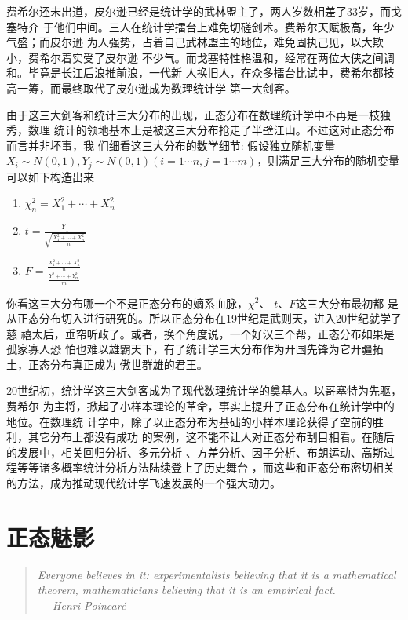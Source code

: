 费希尔还未出道，皮尔逊已经是统计学的武林盟主了，两人岁数相差了33岁，而戈塞特介
于他们中间。三人在统计学擂台上难免切磋剑术。费希尔天赋极高，年少气盛；而皮尔逊
为人强势，占着自己武林盟主的地位，难免固执己见，以大欺小，费希尔着实受了皮尔逊
不少气。而戈塞特性格温和，经常在两位大侠之间调和。毕竟是长江后浪推前浪，一代新
人换旧人，在众多擂台比试中，费希尔都技高一筹，而最终取代了皮尔逊成为数理统计学
第一大剑客。

由于这三大剑客和统计三大分布的出现，正态分布在数理统计学中不再是一枝独秀，数理
统计的领地基本上是被这三大分布抢走了半壁江山。不过这对正态分布而言并非坏事，我
们细看这三大分布的数学细节: 假设独立随机变量 $X_i \sim N(0,1), Y_j \sim N(0,1)
(i=1\cdots n, j=1\cdots m)$，则满足三大分布的随机变量可以如下构造出来
\begin{enumerate}
\item $ \displaystyle \chi_n^2 = X_1^2 + \cdots + X_n^2$
\item $ \displaystyle  t = \frac{Y_1}{\sqrt{\frac{X_1^2 + \cdots + X_n^2}{n}}}$
\item $ \displaystyle  F = \frac{\frac{X_1^2 + \cdots + X_n^2}{n}}{\frac{Y_1^2 + \cdots + Y_m^2}{m}} $
\end{enumerate}

你看这三大分布哪一个不是正态分布的嫡系血脉，$\chi^2$、 $t$、$F$这三大分布最初都
是从正态分布切入进行研究的。所以正态分布在19世纪是武则天，进入20世纪就学了慈
禧太后，垂帘听政了。或者，换个角度说，一个好汉三个帮，正态分布如果是孤家寡人恐
怕也难以雄霸天下，有了统计学三大分布作为开国先锋为它开疆拓土，正态分布真正成为
傲世群雄的君王。

20世纪初，统计学这三大剑客成为了现代数理统计学的奠基人。以哥塞特为先驱，费希尔
为主将，掀起了小样本理论的革命，事实上提升了正态分布在统计学中的地位。在数理统
计学中，除了以正态分布为基础的小样本理论获得了空前的胜利，其它分布上都没有成功
的案例，这不能不让人对正态分布刮目相看。在随后的发展中，相关回归分析、多元分析
、方差分析、因子分析、布朗运动、高斯过程等等诸多概率统计分析方法陆续登上了历史舞台
，而这些和正态分布密切相关的方法，成为推动现代统计学飞速发展的一个强大动力。

\section{正态魅影}

\begin{quotation}
\it{Everyone believes in it: experimentalists believing that it is a
mathematical theorem, mathematicians believing that it is an empirical fact. \\
--- Henri Poincar\'{e}}
\end{quotation}


